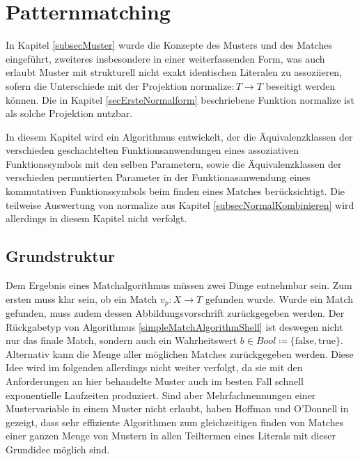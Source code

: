 

\section{Patternmatching} \label{secPattermatching}

In Kapitel \ref{subsecMuster} wurde die Konzepte des Musters und des Matches eingeführt, zweiteres insbesondere in einer weiterfassenden Form, was auch erlaubt Muster mit strukturell nicht exakt identischen Literalen zu assoziieren, sofern die Unterschiede mit der Projektion $\mathrm{normalize} \colon T \rightarrow T$ beseitigt werden können. Die in Kapitel \ref{secErsteNormalform} beschriebene Funktion $\mathrm{normalize}$ ist als solche Projektion nutzbar.  

In diesem Kapitel wird ein Algorithmus entwickelt, der die Äquivalenzklassen der verschieden geschachtelten Funktionsanwendungen eines assoziativen Funktionssymbols mit den selben Parametern, sowie die Äquivalenzklassen der verschieden permutierten Parameter in der Funktionasanwendung eines kommutativen Funktionssymbols beim finden eines Matches berücksichtigt. Die teilweise Auswertung von $\mathrm{normalize}$ aus Kapitel \ref{subsecNormalKombinieren} wird allerdings in diesem Kapitel nicht verfolgt.


\subsection{Grundstruktur} \label{subsecPatternmatchingGrundstruktur}

Dem Ergebnis eines Matchalgorithmus müssen zwei Dinge entnehmbar sein. Zum ersten muss klar sein, ob ein Match $v_p \colon X \rightarrow T$ gefunden wurde. Wurde ein Match gefunden, muss zudem dessen Abbildungsvorschrift zurückgegeben werden. Der Rückgabetyp von Algorithmus \ref{simpleMatchAlgorithmShell} ist deswegen nicht nur das finale Match, sondern auch ein Wahrheitswert $b \in \mathit{Bool} \coloneqq \{\mathrm{false}, \mathrm{true}\}$. Alternativ kann die Menge aller möglichen Matches zurückgegeben werden. Diese Idee wird im folgenden allerdings nicht weiter verfolgt, da sie mit den Anforderungen an hier behandelte Muster auch im besten Fall schnell exponentielle Laufzeiten produziert. Sind aber Mehrfachnennungen einer Mustervariable in einem Muster nicht erlaubt, haben Hoffman und O'Donnell in \cite{patternMatchingInTrees} gezeigt, dass sehr effiziente Algorithmen zum gleichzeitigen finden von Matches einer ganzen Menge von Mustern in allen Teiltermen eines Literals mit dieser Grundidee möglich sind.\\


